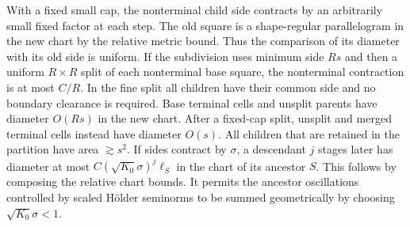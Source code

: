 \documentclass[11pt]{article}
\newcommand{\1}{\mathbf{1}}
\numberwithin{equation}{section}
\begin{document}
With a fixed small cap, the nonterminal child side contracts
by an arbitrarily small fixed factor at each step. The old
square is a shape-regular parallelogram in the new chart by
the relative metric bound. Thus the comparison of its diameter
with its old side is uniform. If the subdivision uses minimum
side \(Rs\) and then a uniform \(R\times R\) split of each
nonterminal base square, the nonterminal contraction is at
most \(C/R\). In the fine split all children have their common
side and no boundary clearance is required. Base terminal cells
and unsplit parents have diameter \(O(Rs)\) in the new chart.
After a fixed-cap split, unsplit and merged terminal cells
instead have diameter \(O(s)\). All children that are retained
in the partition have area \(\gtrsim s^2\). If sides contract
by \(\sigma\), a descendant \(j\) stages later has diameter at
most \(C(\sqrt{K_0}\sigma)^j\ell_S\) in the chart of its
ancestor \(S\). This follows by composing the relative chart
bounds. It permits the ancestor oscillations controlled by
scaled H\"older seminorms to be summed geometrically by choosing
\(\sqrt{K_0}\sigma<1\).
\end{document}
